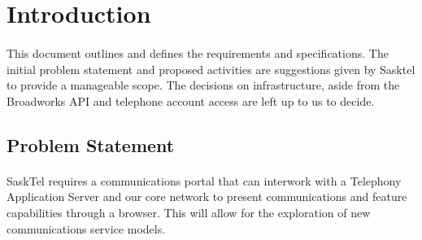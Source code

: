 \documentclass[12pt]{article}
\begin{document}
\pagestyle{plain} %

\tableofcontents %
\cleardoublepage %

\listoffigures %
\cleardoublepage %

\listoftables %
\cleardoublepage %

\pagestyle{plain} %



\doublespacing %



\section{Introduction}
\paragraph{}
	This document outlines and defines the requirements and specifications. The initial problem statement and proposed activities are suggestions given by Sasktel to provide a manageable scope.
The decisions on infrastructure, aside from the Broadworks API and telephone account access are left up to us to decide. 
\subsection{Problem Statement}
\paragraph{} 
	SaskTel requires a communications portal that can interwork with a Telephony Application Server and our core network to present communications and feature capabilities through a browser.  This will allow for the exploration of new communications service models. 
\end{document}
